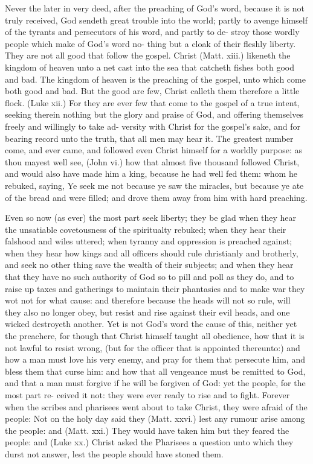 \documentclass{custom}
\begin{document}
Never the later in very deed, after the preaching of 
God's word, because it is not truly received, God sendeth 
great trouble into the world; partly to avenge himself of 
the tyrants and persecutors of his word, and partly to de- 
stroy those wordly people which make of God's word no- 
thing but a cloak of their fleshly liberty. They are not 
all good that follow the gospel. Christ (Matt. xiii.) likeneth 
the kingdom of heaven unto a net cast into the sea that 
catcheth fishes both good and bad. The kingdom of 
heaven is the preaching of the gospel, unto which come 
both good and bad. But the good are few, Christ 
calleth them therefore a little flock. (Luke xii.) For they 
are ever few that come to the gospel of a true intent,
seeking therein nothing but the glory and praise of God,
and offering themselves freely and willingly to take ad- 
versity with Christ for the gospel's sake, and for bearing 
record unto the truth, that all men may hear it. The 
greatest number come, and ever came, and followed even 
Christ himself for a worldly purpose: as thou mayest well 
see, (John vi.) how that almost five thousand followed 
Christ, and would also have made him a king, because he 
had well fed them: whom he rebuked, saying, Ye seek me 
not because ye saw the miracles, but because ye ate of the 
bread and were filled; and drove them away from him with 
hard preaching.

Even so now (as ever) the most part seek liberty; they 
be glad when they hear the unsatiable covetousness of the 
spiritualty rebuked; when they hear their falshood and 
wiles uttered; when tyranny and oppression is preached 
against; when they hear how kings and all officers should 
rule christianly and brotherly, and seek no other thing save 
the wealth of their subjects; and when they hear that they 
have no such authority of God so to pill and poll as they
do, and to raise up taxes and gatherings to maintain their 
phantasies and to make war they wot not for what cause:
and therefore because the heads will not so rule, will they 
also no longer obey, but resist and rise against their evil 
heads, and one wicked destroyeth another. Yet is not 
God's word the cause of this, neither yet the preachere, 
for though that Christ himself taught all obedience, how 
that it is not lawful to resist wrong, (but for the officer that 
is appointed thereunto:) and how a man must love his very 
enemy, and pray for them that persecute him, and bless 
them that curse him: and how that all vengeance must be 
remitted to God, and that a man must forgive if he will be 
forgiven of God: yet the people, for the most part re-
ceived it not: they were ever ready to rise and to fight.
Forever when the scribes and pharisees went about to take 
Christ, they were afraid of the people: Not on the holy 
day said they (Matt. xxvi.) lest any rumour arise among 
the people: and (Matt. xxi.) They would have taken him 
but they feared the people: and (Luke xx.) Christ asked 
the Pharisees a question unto which they durst not answer,
lest the people should have stoned them. 
\end{document}
